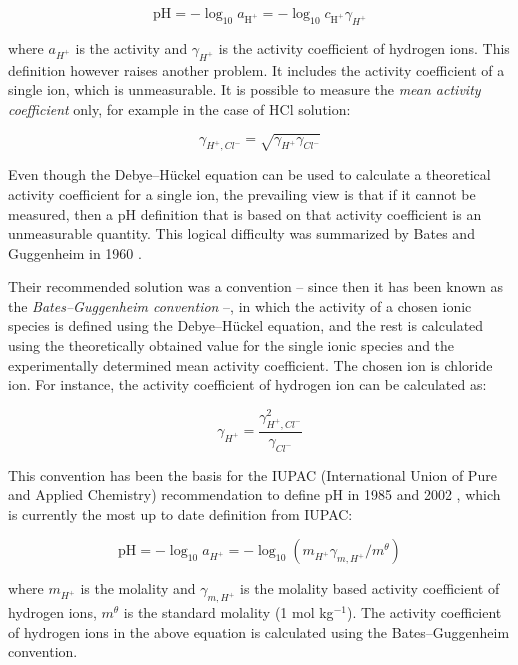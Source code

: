 \documentclass[manuscript=article, journal=jceda8]{achemso}
\begin{document}
\begin{equation}
\textrm{pH} = -\log_{10} a_{\textrm{H}^+} = -\log_{10} c_{\textrm{H}^+} \gamma_{H^+}
\end{equation}

where $a_{H^+}$ is the activity and $\gamma_{H^+}$ is the activity coefficient of hydrogen ions. This definition however raises another problem. It includes the activity coefficient of a single ion, which is unmeasurable. It is possible to measure the \emph{mean activity coefficient} only, for example in the case of HCl solution:

\begin{equation}
\gamma_{H^+, Cl^-} = \sqrt{\gamma_{H^+} \gamma_{Cl^-}}
\end{equation}

Even though the Debye--Hückel equation can be used to calculate a theoretical activity coefficient for a single ion, the prevailing view is that if it cannot be measured, then a pH definition that is based on that activity coefficient is an unmeasurable quantity. This logical difficulty was summarized by Bates and Guggenheim in 1960 \cite{bates1960report}. 

Their recommended solution was a convention -- since then it has been known as the \emph{Bates--Guggenheim convention} --, in which the activity of a chosen ionic species is defined using the Debye--Hückel equation, and the rest is calculated using the theoretically obtained value for the single ionic species and the experimentally determined mean activity coefficient. The chosen ion is chloride ion. For instance, the activity coefficient of hydrogen ion can be calculated as:

\begin{equation}
\gamma_{H^+} = \frac{\gamma_{H^+, Cl^-}^2}{\gamma_{Cl^-}}
\end{equation}

This convention has been the basis for the IUPAC (International Union of Pure and Applied Chemistry) recommendation to define pH in 1985 \cite{covington1985definition} and 2002 \cite{buck2002measurement}, which is currently the most up to date definition from IUPAC:

\begin{equation}
\textrm{pH}= -\log_{10}a_{H^+} = -\log_{10}(m_{H^+} \gamma_{m, H^+}/m^\theta)
\end{equation}

where $m_{H^+}$ is the molality and $\gamma_{m, H^+}$ is the molality based activity coefficient of hydrogen ions, $m^\theta$ is the standard molality (1 mol kg$^{-1}$). The activity coefficient of hydrogen ions in the above equation is calculated using the Bates--Guggenheim convention.
\end{document}

